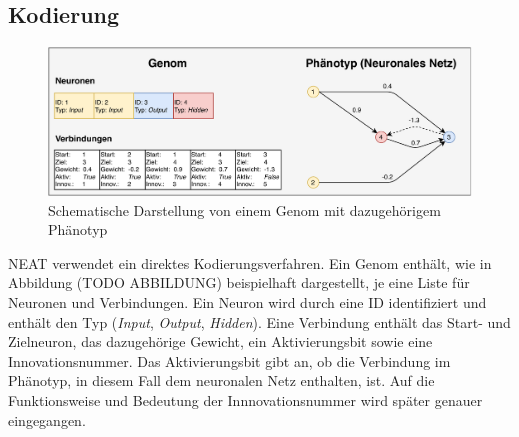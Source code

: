 \subsection{Kodierung}
\label{subsec:neat_encoding} %
\begin{figure}[!h]
	\centering
	\includegraphics[width=1\textwidth]{./img/neat_genome_encoding.pdf} 
	\caption{Schematische Darstellung von einem Genom mit dazugehörigem Phänotyp}
	\label{fig:neat_encoding}
\end{figure}
\ac{NEAT} verwendet ein direktes Kodierungsverfahren. Ein Genom enthält, wie in Abbildung (TODO ABBILDUNG) beispielhaft dargestellt, je eine Liste für Neuronen und Verbindungen. Ein Neuron wird durch eine ID identifiziert und enthält den Typ (\emph{Input}, \emph{Output}, \emph{Hidden}). Eine Verbindung enthält das Start- und Zielneuron, das dazugehörige Gewicht, ein Aktivierungsbit sowie eine Innovationsnummer. Das Aktivierungsbit gibt an, ob die Verbindung im Phänotyp, in diesem Fall dem neuronalen Netz enthalten, ist. Auf die Funktionsweise und Bedeutung der Innnovationsnummer wird später genauer eingegangen.
